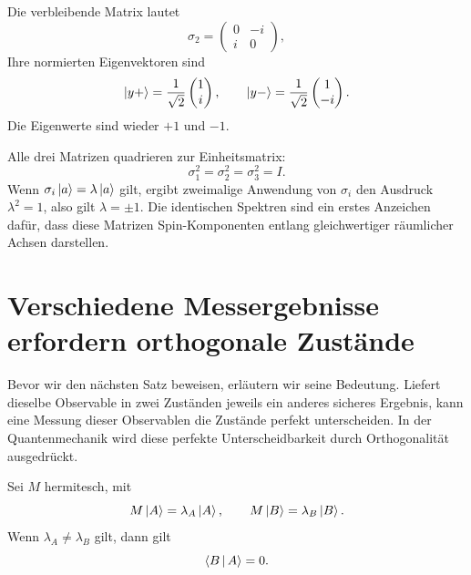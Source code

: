 Die verbleibende Matrix lautet
\begin{equation}
  \sigma_2=
  \begin{pmatrix}
    0&-i\\
    i&0
  \end{pmatrix},
\end{equation}
Ihre normierten Eigenvektoren sind
\begin{equation}
  \left\lvert y+\right\rangle=\frac{1}{\sqrt2}\begin{pmatrix}1\\i\end{pmatrix},
  \qquad
  \left\lvert y-\right\rangle=\frac{1}{\sqrt2}\begin{pmatrix}1\\-i\end{pmatrix}.
  \label{eq:l03-sigma-two-eigenvectors}
\end{equation}
Die Eigenwerte sind wieder \(+1\) und \(-1\).

Alle drei Matrizen quadrieren zur Einheitsmatrix:
\begin{equation}
  \sigma_1^2=\sigma_2^2=\sigma_3^2=I.
  \label{eq:l03-pauli-squares}
\end{equation}
Wenn \(\sigma_i\left\lvert a\right\rangle=\lambda\left\lvert a\right\rangle\) gilt, ergibt zweimalige Anwendung von \(\sigma_i\) den Ausdruck \(\lambda^2=1\), also gilt \(\lambda=\pm1\). Die identischen Spektren sind ein erstes Anzeichen dafür, dass diese Matrizen Spin-Komponenten entlang gleichwertiger räumlicher Achsen darstellen.

\section{Verschiedene Messergebnisse erfordern orthogonale Zustände}

Bevor wir den nächsten Satz beweisen, erläutern wir seine Bedeutung. Liefert dieselbe Observable in zwei Zuständen jeweils ein anderes sicheres Ergebnis, kann eine Messung dieser Observablen die Zustände perfekt unterscheiden. In der Quantenmechanik wird diese perfekte Unterscheidbarkeit durch Orthogonalität ausgedrückt.

\begin{theorem}
Sei \(M\) hermitesch, mit
\begin{equation}
  M\left\lvert A\right\rangle=\lambda_A\left\lvert A\right\rangle,
  \qquad
  M\left\lvert B\right\rangle=\lambda_B\left\lvert B\right\rangle.
\end{equation}
Wenn \(\lambda_A\ne\lambda_B\) gilt, dann gilt
\begin{equation}
  \left\langle B\,\middle|\,A\right\rangle=0.
\end{equation}
\end{theorem}

